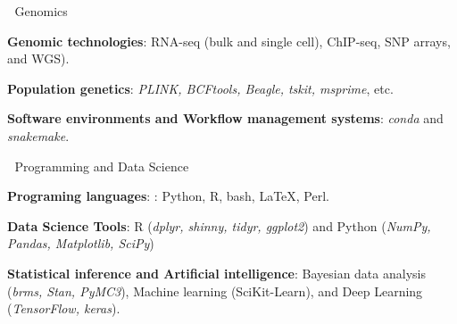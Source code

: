 


\begin{cventries}
\cventry
{$\;$}
{Genomics}
{$\;$}
{$\;$}
{
  \begin{cvitems} %
      \item {
          \begin{flushleft}
            \textbf{Genomic technologies}: RNA-seq (bulk and single cell),
            ChIP-seq, SNP arrays, and WGS).
          \end{flushleft}
        }
        \item {
          \begin{flushleft}
            \textbf{Population genetics}: \textit{PLINK, BCFtools, Beagle, tskit, msprime}, etc. 
          \end{flushleft}
        }
        \item {
          \begin{flushleft}
            \textbf{Software environments and Workflow management systems}: \textit{conda} and \textit{snakemake}.
          \end{flushleft}
        }
  \end{cvitems}
}

\cventry
{$\;$}
{Programming and Data Science}
{$\;$}
{$\;$}
{
  \begin{cvitems} %
      \item {
          \begin{flushleft}
            \textbf{Programing languages}: : Python, R, bash, LaTeX, Perl.
          \end{flushleft}
        }
        \item {
          \begin{flushleft}
            \textbf{Data Science Tools}: R (\textit{dplyr, shinny, tidyr, ggplot2}) and Python (\textit{NumPy, Pandas, Matplotlib, SciPy})
          \end{flushleft}
        }
        \item {
          \begin{flushleft}
            \textbf{Statistical inference and Artificial intelligence}: 
            Bayesian data analysis (\textit{brms, Stan, PyMC3}), Machine learning ({SciKit-Learn}), and
            Deep Learning (\textit{TensorFlow, keras}).
          \end{flushleft}
        }
  \end{cvitems}
}


\end{cventries}
